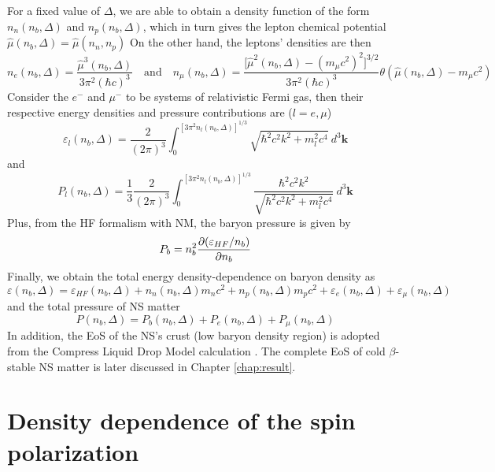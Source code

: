 For a fixed value of $\Delta$, we are able to obtain a density function of the form $n_n (n_b, \Delta)$ and $n_p (n_b, \Delta)$, which in turn gives the lepton chemical potential $\hat{\mu}(n_b,\Delta) = \hat{\mu}(n_n,n_p)$ On the other hand, the leptons' densities are then \citep{loan2011equation}
\begin{equation}
        n_e(n_b,\Delta) = \frac{ \hat{\mu}^3(n_b,\Delta)}{ 3\pi^2 (\hbar c)^3} \quad\text{and}\quad n_\mu(n_b,\Delta) = \frac{ \Big[\hat{\mu}^2(n_b,\Delta) - (m_\mu c^2)^2\Big]^{3/2}}{ 3\pi^2 (\hbar c)^3} \theta(\hat{\mu}(n_b,\Delta)-m_\mu c^2)
\end{equation} 
Consider the $e^-$ and $\mu^-$ to be systems of relativistic Fermi gas, then their respective energy densities and pressure contributions are ($l=e,\mu$) \citep{moustakidis2009equation}
\begin{equation}
        \varepsilon_l(n_b,\Delta) = \frac{ 2}{ (2\pi)^3} \int_{{0}}^{{[3\pi^2n_l(n_b,\Delta)]^{1/3}}} {\sqrt{\hbar^2 c^2 k^2 + m_l^2 c^4}} \: d^3{\mathbf{k}}
\end{equation} 
and
\begin{equation}
        P_l(n_b,\Delta) = \frac{ 1}{ 3} \frac{ 2}{ (2\pi)^3} \int_{{0}}^{{[3\pi^2 n_l(n_b,\Delta)]^{1/3}}} { \frac{ \hbar^2 c^2 k^2}{ \sqrt{\hbar^2 c^2 k^2 + m_l^2 c^4}} } \: d^3{\mathbf{k}}
\end{equation} 
Plus, from the \gls{HF} formalism with \gls{NM}, the baryon pressure is given by
\begin{equation}
        P_b = n_b^2 \pdv{(\varepsilon_{HF}/n_b)}{n_b}
\end{equation}
Finally, we obtain the total energy density-dependence on baryon density as 
\begin{equation}
        \varepsilon(n_b,\Delta) = \varepsilon_{HF}(n_b,\Delta) + n_n(n_b,\Delta)m_n c^2 + n_p(n_b,\Delta)m_p c^2 + \varepsilon_e(n_b,\Delta) + \varepsilon_\mu(n_b,\Delta)
\end{equation}
and the total pressure of \gls{NS} matter
\begin{equation}
        P(n_b,\Delta) = P_b(n_b,\Delta) + P_e(n_b,\Delta) + P_\mu(n_b,\Delta)
\end{equation}
In addition, the \gls{EoS} of the \gls{NS}'s crust (low baryon density region) is adopted from the Compress Liquid Drop Model calculation \citep{douchin2000nuclear,douchin2001unified}. The complete \gls{EoS} of cold $\beta$-stable \gls{NS} matter is later discussed in Chapter \ref{chap:result}.

\section{Density dependence of the spin polarization}%
\label{sec:density_dependence_of_the_spin_polarization}

